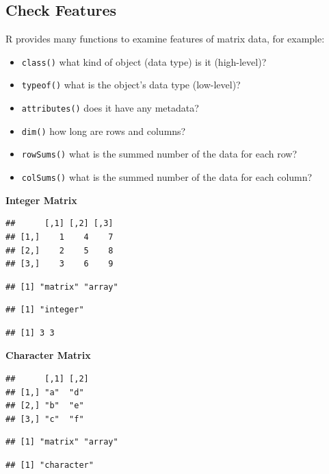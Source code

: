 \documentclass[
]{book}
\providecommand{\tightlist}{%
  \setlength{\itemsep}{0pt}\setlength{\parskip}{0pt}}
\begin{document}
\hypertarget{check-features-1}{%
\subsection{Check Features}\label{check-features-1}}

R provides many functions to examine features of matrix data, for example:

\begin{itemize}
\tightlist
\item
  \texttt{class()} what kind of object (data type) is it (high-level)?
\item
  \texttt{typeof()} what is the object's data type (low-level)?
\item
  \texttt{attributes()} does it have any metadata?
\item
  \texttt{dim()} how long are rows and columns?
\item
  \texttt{rowSums()} what is the summed number of the data for each row?
\item
  \texttt{colSums()} what is the summed number of the data for each column?
\end{itemize}

\textbf{Integer Matrix}\\

\begin{verbatim}
##      [,1] [,2] [,3]
## [1,]    1    4    7
## [2,]    2    5    8
## [3,]    3    6    9
\end{verbatim}

\begin{verbatim}
## [1] "matrix" "array"
\end{verbatim}

\begin{verbatim}
## [1] "integer"
\end{verbatim}

\begin{verbatim}
## [1] 3 3
\end{verbatim}

\textbf{Character Matrix}\\

\begin{verbatim}
##      [,1] [,2]
## [1,] "a"  "d" 
## [2,] "b"  "e" 
## [3,] "c"  "f"
\end{verbatim}

\begin{verbatim}
## [1] "matrix" "array"
\end{verbatim}

\begin{verbatim}
## [1] "character"
\end{verbatim}
\end{document}
